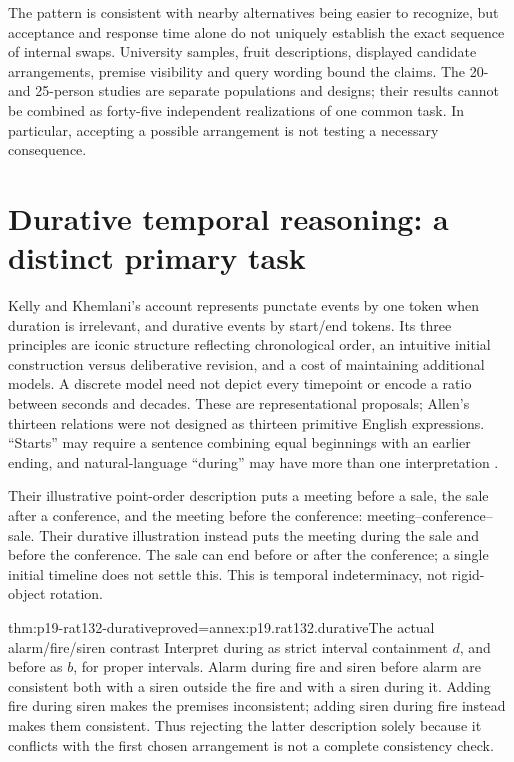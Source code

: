 The pattern is consistent with nearby alternatives being easier to recognize,
but acceptance and response time alone do not uniquely establish the exact
sequence of internal swaps. University samples, fruit descriptions, displayed
candidate arrangements, premise visibility and query wording bound the
claims. The 20- and 25-person studies are separate populations and designs;
their results cannot be combined as forty-five independent realizations of
one common task. In particular, accepting a possible arrangement is not
testing a necessary consequence.

\section{Durative temporal reasoning: a distinct primary task}
\label{sec:p19-rat132-temporal-evidence}

Kelly and Khemlani's account represents punctate events by one token when
duration is irrelevant, and durative events by start/end tokens. Its three
principles are iconic structure reflecting chronological order, an intuitive
initial construction versus deliberative revision, and a cost of maintaining
additional models. A discrete model need not depict every timepoint or
encode a ratio between seconds and decades. These are representational
proposals; Allen's thirteen relations were not designed as thirteen primitive
English expressions. ``Starts'' may require a sentence combining equal
beginnings with an earlier ending, and natural-language ``during'' may have
more than one interpretation \cite[pp.~1--3]{KellyKhemlani2019Durative}.

Their illustrative point-order description puts a meeting before a sale,
the sale after a conference, and the meeting before the conference:
meeting--conference--sale. Their durative illustration instead puts the
meeting during the sale and before the conference. The sale can end before
or after the conference; a single initial timeline does not settle this.
This is temporal indeterminacy, not rigid-object rotation.

\begin{hbtheorem}{thm:p19-rat132-durative}{proved=annex:p19.rat132.durative}{The actual alarm/fire/siren contrast}
Interpret during as strict interval containment \(d\), and before as
\(b\), for proper intervals. Alarm during fire and siren before alarm
are consistent both with a siren outside the fire and with a siren during
it. Adding fire during siren makes the premises inconsistent; adding siren
during fire instead makes them consistent. Thus rejecting the latter
description solely because it conflicts with the first chosen arrangement
is not a complete consistency check.
\end{hbtheorem}

